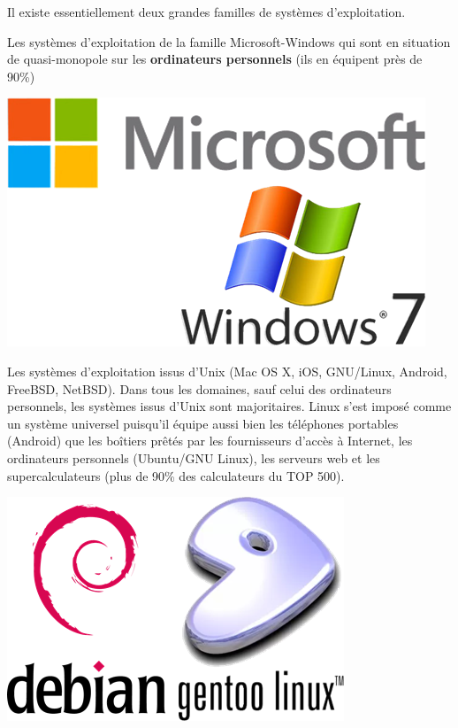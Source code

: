 \documentclass[10pt,fleqn]{article} %
\begin{document}
Il existe essentiellement deux grandes familles de systèmes d’exploitation. 

\begin{minipage}[c]{.7\linewidth}
Les systèmes d’exploitation de la famille Microsoft-Windows qui sont en situation de quasi-monopole sur les \textbf{ordinateurs personnels} (ils en équipent près de 90\%)

\end{minipage} \hfill
\begin{minipage}[c]{.25\linewidth}
\begin{center}
\includegraphics[width=.9\textwidth]{images/ms}
\end{center}
\end{minipage} 

\begin{minipage}[c]{.7\linewidth}
Les systèmes d’exploitation issus d’Unix (Mac OS X, iOS, GNU/Linux, Android, FreeBSD, NetBSD). Dans tous les domaines, sauf celui des ordinateurs personnels, les systèmes issus d’Unix sont majoritaires.  Linux s’est imposé comme un système universel puisqu’il équipe aussi bien les téléphones portables (Android) que les boîtiers prêtés par les fournisseurs d’accès à Internet, les ordinateurs personnels (Ubuntu/GNU Linux), les serveurs web et les supercalculateurs (plus de 90\% des calculateurs du TOP 500).

\end{minipage} \hfill
\begin{minipage}[c]{.25\linewidth}
\begin{center}
\includegraphics[width=.9\textwidth]{images/genlin}
\end{center}
\end{minipage} 
\end{document}
